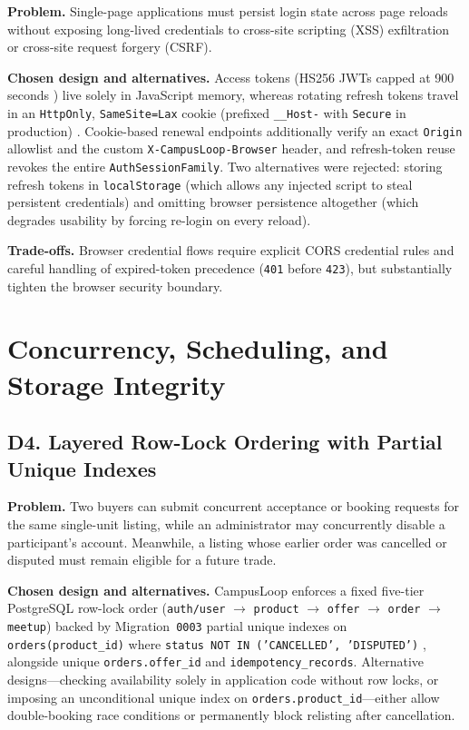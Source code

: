 \textbf{Problem.} Single-page applications must persist login state across page reloads without exposing long-lived credentials to cross-site scripting (XSS) exfiltration or cross-site request forgery (CSRF).

\textbf{Chosen design and alternatives.} Access tokens (HS256 JWTs capped at 900 seconds \cite{rfc7519}) live solely in JavaScript memory, whereas rotating refresh tokens travel in an \texttt{HttpOnly}, \texttt{SameSite=Lax} cookie (prefixed \texttt{\_\_Host-} with \texttt{Secure} in production) \cite{rfc6265,owaspSession}. Cookie-based renewal endpoints additionally verify an exact \texttt{Origin} allowlist and the custom \texttt{X-CampusLoop-Browser} header, and refresh-token reuse revokes the entire \texttt{AuthSessionFamily}. Two alternatives were rejected: storing refresh tokens in \texttt{localStorage} (which allows any injected script to steal persistent credentials) and omitting browser persistence altogether (which degrades usability by forcing re-login on every reload).

\textbf{Trade-offs.} Browser credential flows require explicit CORS credential rules and careful handling of expired-token precedence (\texttt{401} before \texttt{423}), but substantially tighten the browser security boundary.

\section{Concurrency, Scheduling, and Storage Integrity}
\label{sec:dec-concurrency}

\subsection{D4. Layered Row-Lock Ordering with Partial Unique Indexes}

\textbf{Problem.} Two buyers can submit concurrent acceptance or booking requests for the same single-unit listing, while an administrator may concurrently disable a participant's account. Meanwhile, a listing whose earlier order was cancelled or disputed must remain eligible for a future trade.

\textbf{Chosen design and alternatives.} CampusLoop enforces a fixed five-tier PostgreSQL row-lock order (\texttt{auth/user} $\to$ \texttt{product} $\to$ \texttt{offer} $\to$ \texttt{order} $\to$ \texttt{meetup}) \cite{postgresExplicitLocking} backed by Migration~\texttt{0003} partial unique indexes on \texttt{orders(product\_id)} where \texttt{status NOT IN ('CANCELLED', 'DISPUTED')} \cite{postgresPartialIndex}, alongside unique \texttt{orders.offer\_id} and \texttt{idempotency\_records}. Alternative designs---checking availability solely in application code without row locks, or imposing an unconditional unique index on \texttt{orders.product\_id}---either allow double-booking race conditions or permanently block relisting after cancellation.


